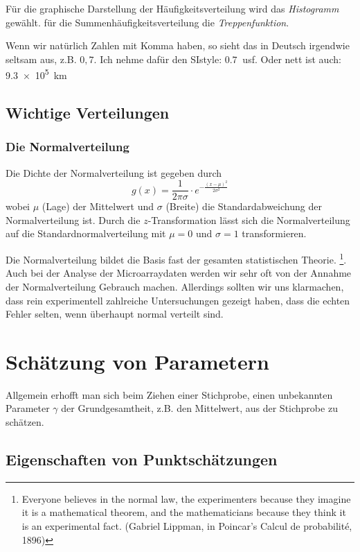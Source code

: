 Für die graphische Darstellung der Häufigkeitsverteilung wird das {\em Histogramm} gewählt. für die Summenhäufigkeitsverteilung die {\em Treppenfunktion}.

Wenn wir natürlich Zahlen mit Komma haben, so sieht das in Deutsch irgendwie seltsam aus, z.B. $0,7$. Ich nehme dafür den SIstyle: $\SI{0,7}{}$ usf.  Oder nett ist auch: \SI{9.3e5}{km}


%
\subsection{Wichtige Verteilungen}

\subsubsection{Die Normalverteilung}
Die Dichte der Normalverteilung ist gegeben durch
\begin{equation}\label{dichtenormal}
g(x) = \frac{1}{2\pi\sigma}\cdot e^{-\frac{(x-\mu)^2}{2\sigma^2}}
\end{equation}
wobei $\mu$ (Lage) der Mittelwert und $\sigma$ (Breite) die Standardabweichung der Normalverteilung ist. 
Durch die $z$-Transformation lässt sich die Normalverteilung auf die Standardnormalverteilung mit $\mu=0$ und $\sigma=1$ transformieren.

Die Normalverteilung bildet die Basis fast der gesamten statistischen Theorie. \footnote{ 
	\glqq Everyone believes in the normal law, the experimenters because they imagine it is a mathematical theorem, and the mathematicians because they think it is an experimental fact.\grqq{} (Gabriel Lippman, in Poincar's Calcul de probabilité, 1896)}. Auch bei der Analyse der Microarraydaten werden wir sehr oft von der Annahme der Normalverteilung Gebrauch machen. Allerdings sollten wir uns klarmachen, dass  rein experimentell zahlreiche Untersuchungen gezeigt haben, dass die echten Fehler selten, wenn überhaupt normal verteilt sind.


\section{Schätzung von Parametern}
Allgemein erhofft man sich beim Ziehen einer Stichprobe, einen unbekannten Parameter $\gamma$ der Grundgesamtheit, z.B. den Mittelwert, aus der Stichprobe zu schätzen.
\subsection{Eigenschaften von Punktschätzungen}
